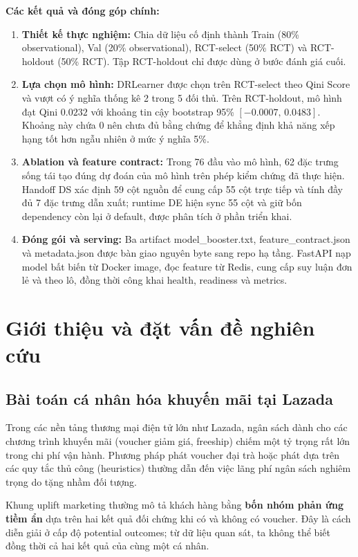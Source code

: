 \documentclass[11pt,a4paper]{article}
\DeclareRobustCommand{\code}[1]{{\small\texttt{#1}}}
\def\code#1{#1}%
\begin{document}
\textbf{Các kết quả và đóng góp chính:}
\begin{enumerate}
    \item \textbf{Thiết kế thực nghiệm:} Chia dữ liệu cố định thành
    \code{Train} (80\% observational), \code{Val} (20\% observational),
    \code{RCT-select} (50\% RCT) và \code{RCT-holdout} (50\% RCT). Tập
    \code{RCT-holdout} chỉ được dùng ở bước đánh giá cuối.
    \item \textbf{Lựa chọn mô hình:} DRLearner được chọn trên
    \code{RCT-select} theo Qini Score và vượt có ý nghĩa thống kê 2 trong 5
    đối thủ. Trên \code{RCT-holdout}, mô hình đạt Qini $0.0232$ với khoảng
    tin cậy bootstrap 95\% $[-0.0007,\,0.0483]$. Khoảng này chứa 0 nên chưa
    đủ bằng chứng để khẳng định khả năng xếp hạng tốt hơn ngẫu nhiên ở mức
    ý nghĩa 5\%.
    \item \textbf{Ablation và feature contract:} Trong 76 đầu vào mô hình,
    62 đặc trưng sống tái tạo đúng dự đoán của mô hình trên phép kiểm chứng
    đã thực hiện. Handoff DS xác định 59 cột nguồn để cung cấp 55 cột trực
    tiếp và tính đầy đủ 7 đặc trưng dẫn xuất; runtime DE hiện sync 55 cột và
    giữ bốn dependency còn lại ở default, được phân tích ở phần triển khai.
    \item \textbf{Đóng gói và serving:} Ba artifact
    \code{model\_booster.txt}, \code{feature\_contract.json} và
    \code{metadata.json} được bàn giao nguyên byte sang repo hạ tầng. FastAPI
    nạp model bất biến từ Docker image, đọc feature từ Redis, cung cấp suy
    luận đơn lẻ và theo lô, đồng thời công khai health, readiness và metrics.
\end{enumerate}

\section{Giới thiệu và đặt vấn đề nghiên cứu}

\subsection{Bài toán cá nhân hóa khuyến mãi tại Lazada}
Trong các nền tảng thương mại điện tử lớn như Lazada, ngân sách dành cho các chương trình khuyến mãi (voucher giảm giá, freeship) chiếm một tỷ trọng rất lớn trong chi phí vận hành. Phương pháp phát voucher đại trà hoặc phát dựa trên các quy tắc thủ công (heuristics) thường dẫn đến việc lãng phí ngân sách nghiêm trọng do tặng nhầm đối tượng.

Khung uplift marketing thường mô tả khách hàng bằng \textbf{bốn nhóm phản
ứng tiềm ẩn} dựa trên hai kết quả đối chứng khi có và không có voucher. Đây
là cách diễn giải ở cấp độ potential outcomes; từ dữ liệu quan sát, ta không
thể biết đồng thời cả hai kết quả của cùng một cá nhân.
\end{document}
